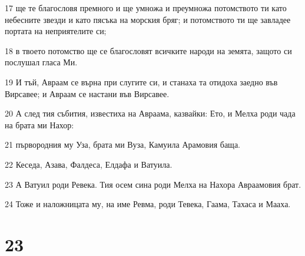 \par 17 ще те благословя премного и ще умножа и преумножа потомството ти като небесните звезди и като пясъка на морския бряг; и потомството ти ще завладее портата на неприятелите си;
\par 18 в твоето потомство ще се благословят всичките народи на земята, защото си послушал гласа Ми.
\par 19 И тъй, Авраам се върна при слугите си, и станаха та отидоха заедно във Вирсавее; и Авраам се настани във Вирсавее.
\par 20 А след тия събития, известиха на Авраама, казвайки: Ето, и Мелха роди чада на брата ми Нахор:
\par 21 първородния му Уза, брата ми Вуза, Камуила Арамовия баща.
\par 22 Кеседа, Азава, Фалдеса, Елдафа и Ватуила.
\par 23 А Ватуил роди Ревека. Тия осем сина роди Мелха на Нахора Авраамовия брат.
\par 24 Тоже и наложницата му, на име Ревма, роди Тевека, Гаама, Тахаса и Мааха.

\chapter{23}

